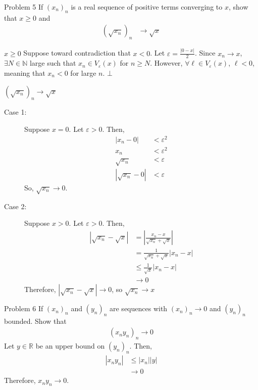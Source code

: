 \documentclass[8pt]{extarticle}
\newcommand{\N}{\mathbb{N}}
\newcommand{\R}{\mathbb{R}}
\begin{document}
  \begin{problem}{Problem 5}
    If $(x_n)_n$ is a real sequence of positive terms converging to $x$, show that $x \geq 0$ and 
    \begin{align*}
      \left(\sqrt{x_n}\right)_n &\rightarrow \sqrt{x}
    \end{align*}
    \tcblower
    \begin{problem}{$x \geq 0$}
      Suppose toward contradiction that $x < 0$. Let $\varepsilon = \frac{|0-x|}{2}$. Since $x_n \rightarrow x$, $\exists N\in \N$ large such that $x_n\in V_{\varepsilon}(x)$ for $n\geq N$. However, $\forall \ell\in V_{\varepsilon}(x)$, $\ell < 0$, meaning that $x_n < 0$ for large $n$. $\bot$
    \end{problem}
    \begin{problem}{$\left(\sqrt{x_n}\right)_n\rightarrow \sqrt{x}$}
      \begin{description}
        \item[Case 1:] Suppose $x = 0$. Let $\varepsilon > 0$. Then,
          \begin{align*}
            |x_n - 0| &< \varepsilon^2\\
            x_n &< \varepsilon^2\\
            \sqrt{x_n} &< \varepsilon\\
            |\sqrt{x_n} - 0| &< \varepsilon
          \end{align*}
          So, $\sqrt{x_n} \rightarrow 0$.
        \item[Case 2:] Suppose $x > 0$. Let $\varepsilon > 0$. Then,
          \begin{align*}
            \left|\sqrt{x_n} - \sqrt{x}\right| &= \left|\frac{x_n - x}{\sqrt{x_n} + \sqrt{x}}\right|\\
                                               &= \frac{1}{\sqrt{x_n}+\sqrt{x}}|x_n - x|\\
                                               &\leq \frac{1}{\sqrt{x}}|x_n - x|\\
                                               &\rightarrow 0
          \end{align*}
          Therefore, $|\sqrt{x_n}-\sqrt{x}| \rightarrow 0$, so $\sqrt{x_n}\rightarrow x$
      \end{description}
    \end{problem}
  \end{problem}
  \begin{problem}{Problem 6}
    If $(x_n)_n$ and $(y_n)_n$ are sequences with $(x_n)_n \rightarrow 0$ and $(y_n)_n$ bounded. Show that
    \begin{align*}
      (x_ny_n)_n \rightarrow 0
    \end{align*}
    \tcblower
    Let $y\in\R$ be an upper bound on $\left(y_n\right)_n$. Then,
    \begin{align*}
      |x_ny_n| &\leq |x_n||y|\\
               &\rightarrow 0
    \end{align*}
    Therefore, $x_ny_n \rightarrow 0$.
  \end{problem}
\end{document}
